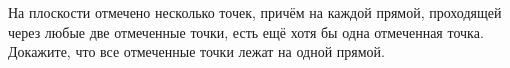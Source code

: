 \begin{problems}
\item На плоскости отмечено несколько точек, причём на каждой прямой, проходящей через любые две отмеченные точки, есть ещё хотя бы одна отмеченная точка. Докажите, что все отмеченные точки лежат на одной прямой.


\end{problems}

